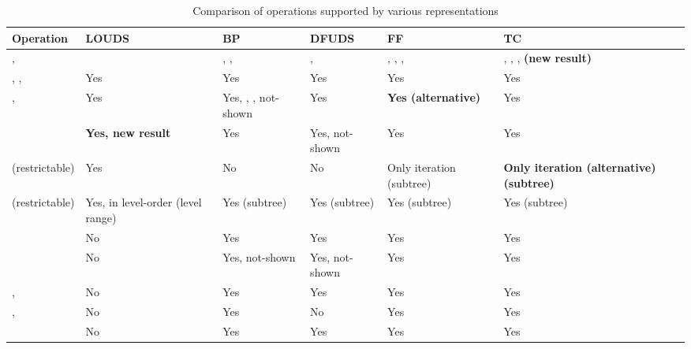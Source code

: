 \begin{sidewaystable}
	\centering
	\begin{tabularx}{\textwidth}{|L{1}||L{1}|L{1}|L{1}|L{1}|L{1}|}
		\hline
		Operation
		& LOUDS
		& BP
		& DFUDS
		& FF
		& TC
		\\ \hline \hline

		\anyRank{}, \newline
		\anySelect{}
		& \loAny{}
		& \preAny{}, \postAny{}, \inAny{}
		& \preAny{}, \dfudsAny{}
		& \preAny{}, \postAny{}, \dfudsAny{}, \inAny{}
		& \preAny{}, \postAny{}, \dfudsAny{}, \textbf{\inAny{} (new result)}
		\\ \hline
		
		\parent{}, \isRoot{}, \isLeaf{}
		& Yes
		& Yes
		& Yes
		& Yes
		& Yes
		\\ \hline
		
		\childAny{}, \degree{}
		& Yes
		& Yes, \childRank{}, \childSelect{}, \degree{} not-shown
		& Yes
		& \textbf{Yes (alternative)}
		& Yes
		\\ \hline
		
		\dep{}
		& \textbf{Yes, new result}
		& Yes
		& Yes, not-shown
		& Yes
		& Yes
		\\ \hline
	
		\levelAny{} (restrictable)
		& Yes
		& No
		& No
		& Only iteration (subtree)
		& \textbf{Only iteration (alternative) (subtree)}
		\\ \hline
		
		\leafAny{} (restrictable)
		& Yes, in level-order (level range)
		& Yes (subtree)
		& Yes (subtree)
		& Yes (subtree)
		& Yes (subtree)
		\\ \hline
		
		\isAncestor{}
		& No
		& Yes
		& Yes
		& Yes
		& Yes
		\\ \hline
		
		\levelAncestor{}
		& No
		& Yes, not-shown
		& Yes, not-shown
		& Yes
		& Yes
		\\ \hline
		
		\lca{}, \distance{}
		& No
		& Yes
		& Yes
		& Yes
		& Yes
		\\ \hline
		
		\hei{}, \deepestVertex{}
		& No
		& Yes
		& No
		& Yes
		& Yes
		\\ \hline
		
		\subtreeSize{}
		& No
		& Yes
		& Yes
		& Yes
		& Yes
		\\ \hline
	\end{tabularx}
	\caption{Comparison of operations supported by various representations}
	\label{tab:comparison}
\end{sidewaystable}

